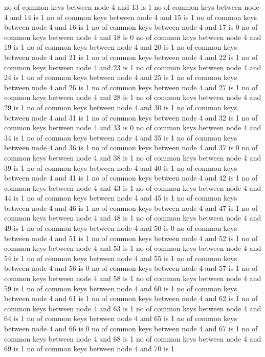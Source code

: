 no of common keys between node 4 and 13 is 1
no of common keys between node 4 and 14 is 1
no of common keys between node 4 and 15 is 1
no of common keys between node 4 and 16 is 1
no of common keys between node 4 and 17 is 0
no of common keys between node 4 and 18 is 0
no of common keys between node 4 and 19 is 1
no of common keys between node 4 and 20 is 1
no of common keys between node 4 and 21 is 1
no of common keys between node 4 and 22 is 1
no of common keys between node 4 and 23 is 1
no of common keys between node 4 and 24 is 1
no of common keys between node 4 and 25 is 1
no of common keys between node 4 and 26 is 1
no of common keys between node 4 and 27 is 1
no of common keys between node 4 and 28 is 1
no of common keys between node 4 and 29 is 1
no of common keys between node 4 and 30 is 1
no of common keys between node 4 and 31 is 1
no of common keys between node 4 and 32 is 1
no of common keys between node 4 and 33 is 0
no of common keys between node 4 and 34 is 1
no of common keys between node 4 and 35 is 1
no of common keys between node 4 and 36 is 1
no of common keys between node 4 and 37 is 0
no of common keys between node 4 and 38 is 1
no of common keys between node 4 and 39 is 1
no of common keys between node 4 and 40 is 1
no of common keys between node 4 and 41 is 1
no of common keys between node 4 and 42 is 1
no of common keys between node 4 and 43 is 1
no of common keys between node 4 and 44 is 1
no of common keys between node 4 and 45 is 1
no of common keys between node 4 and 46 is 1
no of common keys between node 4 and 47 is 1
no of common keys between node 4 and 48 is 1
no of common keys between node 4 and 49 is 1
no of common keys between node 4 and 50 is 0
no of common keys between node 4 and 51 is 1
no of common keys between node 4 and 52 is 1
no of common keys between node 4 and 53 is 1
no of common keys between node 4 and 54 is 1
no of common keys between node 4 and 55 is 1
no of common keys between node 4 and 56 is 0
no of common keys between node 4 and 57 is 1
no of common keys between node 4 and 58 is 1
no of common keys between node 4 and 59 is 1
no of common keys between node 4 and 60 is 1
no of common keys between node 4 and 61 is 1
no of common keys between node 4 and 62 is 1
no of common keys between node 4 and 63 is 1
no of common keys between node 4 and 64 is 1
no of common keys between node 4 and 65 is 1
no of common keys between node 4 and 66 is 0
no of common keys between node 4 and 67 is 1
no of common keys between node 4 and 68 is 1
no of common keys between node 4 and 69 is 1
no of common keys between node 4 and 70 is 1
